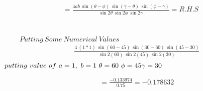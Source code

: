 \documentclass[journal,12pt,twocolumn]{IEEEtran}
\begin{document}
\begin{multline*}
=\frac{4ab~\sin(\theta-\phi)~\sin(\gamma-\theta)~\sin(\phi-\gamma)}{ \sin2\theta~\sin2\phi~\sin2\gamma} = R.H.S
\end{multline*}
\\\\
$~~~~~~~~~~Putting ~Some ~Numerical~ Values$
\begin{multline*}
~~~~~~~~\frac{4~(1*1)~\sin(60-45)~\sin(30-60)~\sin(45-30)}{ \sin2(60)~\sin2(45)~\sin2(30)}\\
\end{multline*}
$putting~ value~ of~a=1,~b=1 ~\theta=60~\phi=45 \\ \gamma=30$

\begin{multline*}
~~~~~~~~=\frac{-0.133974}{0.75}=-0.178632\\
\end{multline*}
\end{document}
